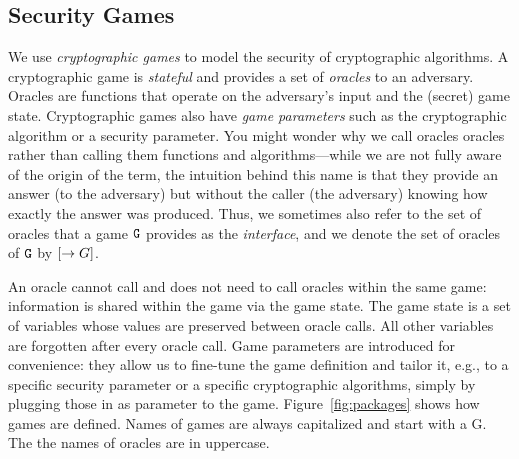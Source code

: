 \subsection{Security Games}\label{ssec:security-games}
We use \emph{cryptographic games} to model the security of cryptographic algorithms.
A cryptographic game is \emph{stateful} and provides a set of \emph{oracles} to an
adversary. Oracles are functions that operate on the adversary's input and the (secret)
game state. Cryptographic games also have \emph{game parameters} such as the
cryptographic algorithm or a security parameter. You might wonder why we call oracles
oracles rather than calling them functions and algorithms---while we are not fully 
aware of the origin of the term, the intuition behind this name is that they provide
an answer (to the adversary) but without the caller (the adversary) knowing how
exactly the answer was produced. Thus, we sometimes also refer to the set of oracles that
a game $\text{\texttt{G}}$ provides as the \emph{interface}, and we denote the set of oracles
of $\text{\texttt{G}}$ by $[\rightarrow G]$.

An oracle cannot call and does not need to call oracles within the same game: information is shared within the game via the game state. The game state is a set of variables whose values are preserved between oracle calls. All other variables are forgotten after every oracle call.
Game parameters are introduced for convenience: they allow us to fine-tune the game definition and tailor it, e.g., to a specific security parameter or a specific cryptographic algorithms, simply by plugging those in as parameter to the game. Figure~\ref{fig:packages} shows how games are defined. Names of games are always capitalized and start with a G. The the names of oracles are in uppercase.

